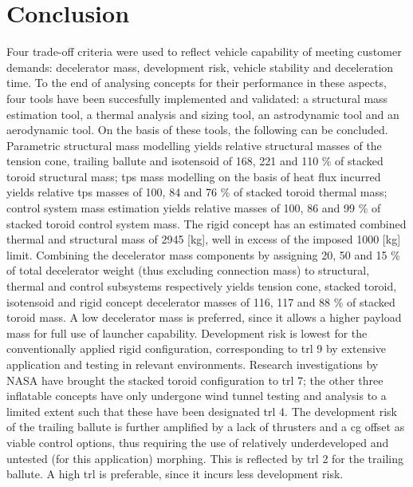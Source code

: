 \section{Conclusion}\label{cha:conclusion}
Four trade-off criteria were used to reflect vehicle capability of meeting customer demands: decelerator mass, development risk, vehicle stability and deceleration time. To the end of analysing concepts for their performance in these aspects, four tools have been succesfully implemented and validated: a structural mass estimation tool, a thermal analysis and sizing tool, an astrodynamic tool and an aerodynamic tool. On the basis of these tools, the following can be concluded.
\newline
\newline
Parametric structural mass modelling yields relative structural masses of the tension cone, trailing ballute and isotensoid of 168, 221 and 110 \% of stacked toroid structural mass; \acrfull{tps} mass modelling on the basis of heat flux incurred yields relative \gls{tps} masses of 100, 84 and 76 \% of stacked toroid thermal mass; control system mass estimation yields relative masses of 100, 86 and 99 \% of stacked toroid control system mass. The rigid concept has an estimated combined thermal and structural mass of 2945 [kg], well in excess of the imposed 1000 [kg] limit. Combining the decelerator mass components by assigning 20, 50 and 15 \% of total decelerator weight (thus excluding connection mass) to structural, thermal and control subsystems respectively yields tension cone, stacked toroid, isotensoid and rigid concept decelerator masses of 116, 117 and 88 \% of stacked toroid mass. A low decelerator mass is preferred, since it allows a higher payload mass for full use of launcher capability.
\newline
\newline
Development risk is lowest for the conventionally applied rigid configuration, corresponding to \acrfull{trl} 9 by extensive application and testing in relevant environments. Research investigations by NASA have brought the stacked toroid configuration to \gls{trl} 7; the other three inflatable concepts have only undergone wind tunnel testing and analysis to a limited extent such that these have been designated \gls{trl} 4. The development risk of the trailing ballute is further amplified by a lack of thrusters and a \gls{cg} offset as viable control options, thus requiring the use of relatively underdeveloped and untested (for this application) morphing. This is reflected by \gls{trl} 2 for the trailing ballute. A high \gls{trl} is preferable, since it incurs less development risk.
